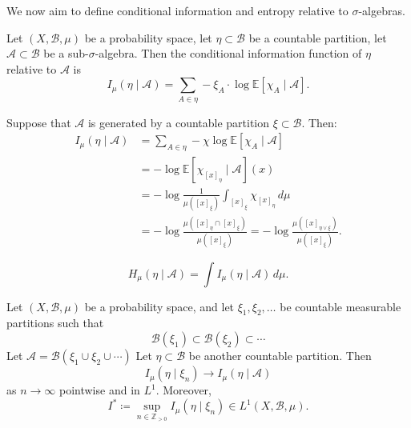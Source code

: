 \documentclass{article}
\newcommand{\B}{\mathcal{B}}
\begin{document}
We now aim to define conditional information and entropy relative to $\sigma$-algebras.
\begin{defi}
  Let $(X, \mathcal{B},\mu)$ be a probability space, let $\eta \subset \mathcal{B}$ be a countable partition, let $\mathcal{A} \subset \mathcal{B}$ be a sub-$\sigma$-algebra.
  Then the conditional information function of $\eta$ relative to $\mathcal{A}$ is
  \begin{equation*}
    I_\mu(\eta \mid \mathcal{A}) = \sum_{A \in \eta} -\xi_A \cdot \log \mathbb{E}[\chi_A \mid \mathcal{A}].
  \end{equation*}
\end{defi}
\begin{eg}
  Suppose that $\mathcal{A}$ is generated by a countable partition $\xi \subset \mathcal{B}$. Then:
  \begin{align*}
    I_\mu(\eta \mid \mathcal{A}) &= \sum_{A \in \eta} -\chi \log \mathbb{E}[\chi_A \mid \mathcal{A}] \\
                                 &= -\log \mathbb{E}[\chi_{[x]_\eta} \mid \mathcal{A}](x) \\
                                 &= -\log \frac{1}{\mu([x]_\xi)} \int_{[x]_\xi} \chi_{[x]_\eta} \, d\mu \\
                                 &= -\log \frac{\mu([x]_\eta \cap [x]_\xi)}{\mu([x]_\xi)} = - \log \frac{\mu([x]_{\eta \vee \xi})}{\mu([x]_\xi)}.
  \end{align*}
\end{eg}
\begin{defi}
  \begin{equation*}
    H_\mu(\eta \mid \mathcal{A}) = \int\!I_\mu(\eta \mid \mathcal{A})\,d\mu.
  \end{equation*}
\end{defi}
\begin{thm}
  Let $(X,\mathcal{B},\mu)$ be a probability space, and let $\xi_1, \xi_2, \dotsc$ be countable measurable partitions such that
  \begin{equation*}
    \B(\xi_1) \subset \B(\xi_2) \subset \dotsb
  \end{equation*}
  Let $\mathcal{A} = \B(\xi_1 \cup \xi_2 \cup \dotsb)$
  Let $\eta \subset \B$ be another countable partition.
  Then
  \begin{equation*}I_\mu(\eta \mid \xi_n) \to I_\mu(\eta \mid \mathcal{A})\end{equation*}
  as $n \to \infty$ pointwise and in $L^1$.
  Moreover,
  \begin{equation*}
    I^* \coloneqq \sup_{n \in \mathbb{Z}_{>0}} I_\mu(\eta \mid \xi_n)  \in L^1(X,\B,\mu).
  \end{equation*}
\end{thm}
\printindex
\end{document}
